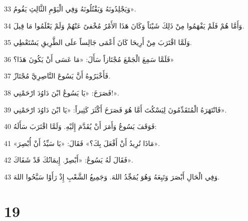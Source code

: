 \par 33 وَيَجْلِدُونَهُ وَيَقْتُلُونَهُ وَفِي الْيَوْمِ الثَّالِثِ يَقُومُ».
\par 34 وَأَمَّا هُمْ فَلَمْ يَفْهَمُوا مِنْ ذَلِكَ شَيْئاً وَكَانَ هَذَا الأَمْرُ مُخْفىً عَنْهُمْ وَلَمْ يَعْلَمُوا مَا قِيلَ.
\par 35 وَلَمَّا اقْتَرَبَ مِنْ أَرِيحَا كَانَ أَعْمَى جَالِساً علَى الطَّرِيقِ يَسْتَعْطِي.
\par 36 فَلَمَّا سَمِعَ الْجَمْعَ مُجْتَازاً سَأَلَ: «مَا عَسَى أَنْ يَكُونَ هَذَا؟»
\par 37 فَأَخْبَرُوهُ أَنَّ يَسُوعَ النَّاصِرِيَّ مُجْتَازٌ.
\par 38 فَصَرَخَ: «يَا يَسُوعُ ابْنَ دَاوُدَ ارْحَمْنِي!».
\par 39 فَانْتَهَرَهُ الْمُتَقَدِّمُونَ لِيَسْكُتَ أَمَّا هُوَ فَصَرَخَ أَكْثَرَ كَثِيراً: «يَا ابْنَ دَاوُدَ ارْحَمْنِي».
\par 40 فَوَقَفَ يَسُوعُ وَأَمَرَ أَنْ يُقَدَّمَ إِلَيْهِ. وَلَمَّا اقْتَرَبَ سَأَلَهُ:
\par 41 «مَاذَا تُرِيدُ أَنْ أَفْعَلَ بِكَ؟» فَقَالَ: «يَا سَيِّدُ أَنْ أُبْصِرَ».
\par 42 فَقَالَ لَهُ يَسُوعُ: «أَبْصِرْ. إِيمَانُكَ قَدْ شَفَاكَ».
\par 43 وَفِي الْحَالِ أَبْصَرَ وَتَبِعَهُ وَهُوَ يُمَجِّدُ اللهَ. وَجَمِيعُ الشَّعْبِ إِذْ رَأَوْا سَبَّحُوا اللهَ.

\chapter{19}

